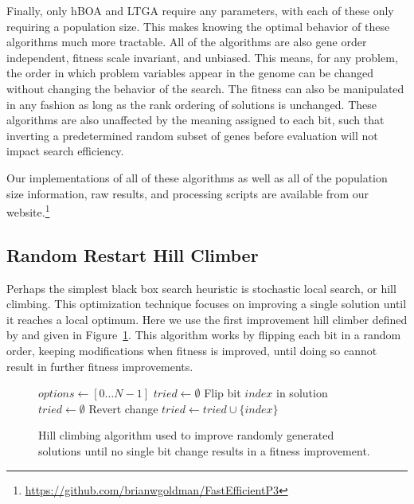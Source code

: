 \documentclass[twoside]{article}
\begin{document}
Finally, only hBOA and LTGA require any parameters, with each of these only requiring a population
size. This makes knowing the optimal behavior of these algorithms much more tractable. All of the
algorithms are also gene order independent, fitness scale invariant, and unbiased. This means,
for any problem, the order in which problem variables appear in the genome can be changed
without changing the behavior of the search. The fitness can also be manipulated in any fashion
as long as the rank ordering of solutions is unchanged. These algorithms are also unaffected by the meaning
assigned to each bit, such that inverting a predetermined random subset of genes before evaluation
will not impact search efficiency.

Our implementations of all of these algorithms as well as all of the population size information, raw results,
and processing scripts
are available from our website.\footnote{\url{https://github.com/brianwgoldman/FastEfficientP3}}
\subsection{Random Restart Hill Climber}
\label{sec-hill-climber}
Perhaps the simplest black box search heuristic is stochastic local search, or hill climbing.
This optimization technique focuses on improving a single solution until it reaches a local
optimum. Here we use the first improvement hill climber defined by \cite{goldman:2014:p3}
and given in Figure~\ref{fig-hc}. This algorithm works by flipping each bit in a random
order, keeping modifications when fitness is improved, until doing so cannot result in
further fitness improvements.

\begin{figure}
  \begin{algorithmic}[1]
    \State $options \leftarrow [0 \dots N-1]$\label{fig-hc-options}
    \State $tried \leftarrow \emptyset$
          \State Flip bit $index$ in solution
            \State $tried \leftarrow \emptyset$
          \Else
            \State Revert change
          \EndIf
          \State $tried \leftarrow tried \cup \{index\}$
        \EndIf
      \EndFor
    \EndWhile
  \EndProcedure
\end{algorithmic}
  \caption{Hill climbing algorithm used to improve randomly generated solutions until no single
           bit change results in a fitness improvement.}
  \label{fig-hc}
\end{figure}
\end{document}
